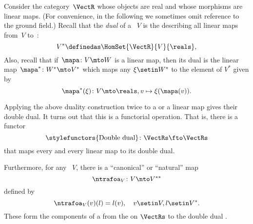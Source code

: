 \begin{example}
    \label{ex:Vect}
    Consider the category~$\VectR$ whose objects are real  and whose morphisms are linear maps.
    (For convenience, in the following we sometimes omit reference to the ground field.)
    Recall that the \emph{dual} of a ~$V$ is the  describing all linear maps from~$V$ to~\reals:
    \begin{equation}
        \label{eq:dual-vector-space}
        V^* \definedas \HomSet{\VectR}{V}{\reals},
    \end{equation}
    Also, recall that if~$\mapa\colon V \mto W$ is a linear map, then its dual is the linear map~$\mapa^* \linebreak[1] \colon W^* \mto V^*$ which maps any $\xi \setin W^*$ to the element of $V^*$ given by
    \begin{equation}
        \mapa^*(\xi) \colon V \mto \reals, v \mapsto \xi(\mapa(v)).
    \end{equation}

    Applying the above duality construction twice to a  or a linear map gives their double dual.
    It turns out that this is a functorial operation.
    That is, there is a functor
    \begin{equation}
        \label{eq:double-dual-functor}
        \text{\stylefunctors{Double dual}}\colon \VectRs \fto \VectRs
    \end{equation}
    that maps every  and every linear map to its double dual.

    Furthermore, for any ~$V$, there is a ``canonical'' or ``natural'' map
    \begin{equation}
        \ntrafoa_V \colon V \nto V^{**}
    \end{equation}
    defined by
    \begin{equation}
        \label{eq:natural-trafo-to-double-dual}
        \ntrafoa_V(v)(l) = l(v), \quad v \setin V, l \setin V^*.
    \end{equation}
    These form the components of a  from the  on $\VectRs$ to the double dual .
\end{example}

